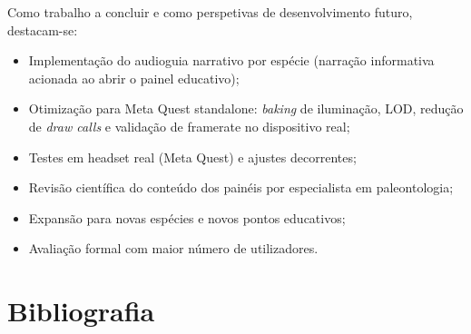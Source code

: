 \documentclass[a4paper,11pt]{report}
\newcommand{\blankpage}{%
    \newpage
    \thispagestyle{empty}
    \mbox{}
    \newpage
}
\begin{document}
Como trabalho a concluir e como perspetivas de desenvolvimento futuro, destacam-se:

\begin{itemize}
    \setlength\itemsep{0pt}
    \item Implementação do audioguia narrativo por espécie (narração
          informativa acionada ao abrir o painel educativo);
    \item Otimização para Meta Quest standalone: \textit{baking} de
          iluminação, LOD, redução de \textit{draw calls} e validação
          de framerate no dispositivo real;
    \item Testes em headset real (Meta Quest) e ajustes decorrentes;
    \item Revisão científica do conteúdo dos painéis por especialista
          em paleontologia;
    \item Expansão para novas espécies e novos pontos educativos;
    \item Avaliação formal com maior número de utilizadores.
\end{itemize}

\blankpage

\chapter*{Bibliografia}
\end{document}

